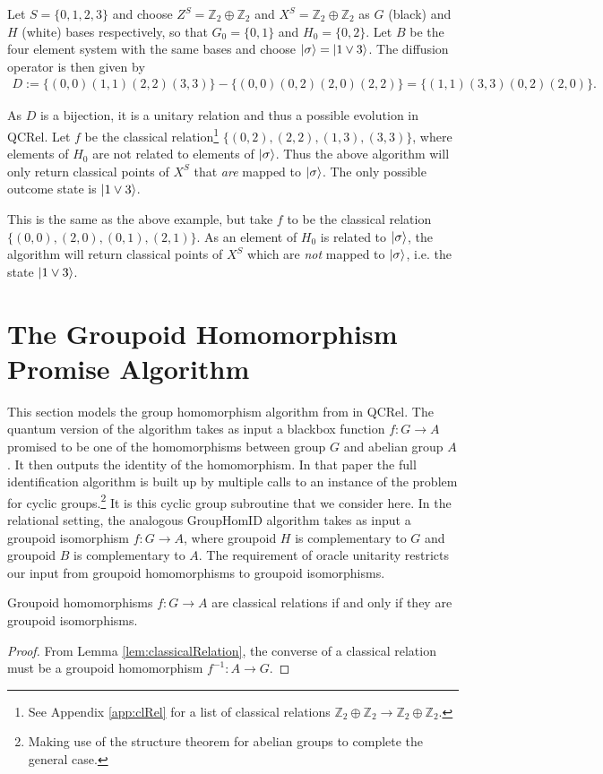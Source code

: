 \begin{example}
Let $S=\{0,1,2,3\}$ and choose $Z^S=\mathbb{Z}_2\oplus\mathbb{Z}_2$ and $X^S=\mathbb{Z}_2\oplus\mathbb{Z}_2$ as $G$ (black) and $H$ (white) bases respectively, so that $G_0=\{0,1\}$ and $H_0 = \{0,2\}$. Let $B$ be the four element system with the same bases and choose $| \sigma \rangle=| 1\vee3 \rangle$. The diffusion operator is then given by
\begin{align*}
D := \{(0,0)(1,1)(2,2)(3,3)\}-\{(0,0)(0,2)(2,0)(2,2)\}=\{(1,1)(3,3)(0,2)(2,0)\}.
\end{align*}

As $D$ is a bijection, it is a unitary relation and thus a possible evolution in QCRel. Let $f$ be the classical relation\footnote{See Appendix \ref{app:clRel} for a list of classical relations $\mathbb{Z}_2\oplus\mathbb{Z}_2\to\mathbb{Z}_2\oplus\mathbb{Z}_2$.} $\{(0,2),(2,2),(1,3),(3,3)\}$, where elements of $H_0$ are not related to elements of $| \sigma \rangle$. Thus the above algorithm will only return classical points of $X^{S}$ that \textit{are} mapped to $| \sigma \rangle$.  The only possible outcome state is $| 1\vee 3 \rangle$.
\end{example}

\begin{example}
This is the same as the above example, but take $f$ to be the classical relation $\{(0,0),(2,0),(0,1),(2,1)\}$. As an element of $H_0$ is related to $| \sigma \rangle$, the algorithm will return classical points of $X^S$ which are \emph{not} mapped to $| \sigma \rangle$, i.e. the state $| 1\vee3 \rangle$.
\end{example}

\section{The Groupoid Homomorphism Promise Algorithm}

This section models the group homomorphism algorithm from \cite{zeng-unitary} in QCRel.  The quantum version of the algorithm takes as input a blackbox function $f:G\to A$ promised to be one of the homomorphisms between group $G$ and abelian group $A$.  It then outputs the identity of the homomorphism. In that paper the full identification algorithm is built up by multiple calls to an instance of the problem for cyclic groups.\footnote{Making use of the structure theorem for abelian groups to complete the general case.} It is this cyclic group subroutine that we consider here. In the relational setting, the analogous GroupHomID algorithm takes as input a groupoid isomorphism $f:G\to A$, where groupoid $H$ is complementary to $G$ and groupoid $B$ is complementary to $A$.  The requirement of oracle unitarity restricts our input from groupoid homomorphisms to groupoid isomorphisms.
\begin{corollary}
Groupoid homomorphisms $f:G\to A$ are classical relations if and only if they are groupoid isomorphisms.
\end{corollary}
\begin{proof}
From Lemma \ref{lem:classicalRelation}, the converse of a classical relation must be a groupoid homomorphism $f^{-1}:A\to G$.
\end{proof}

